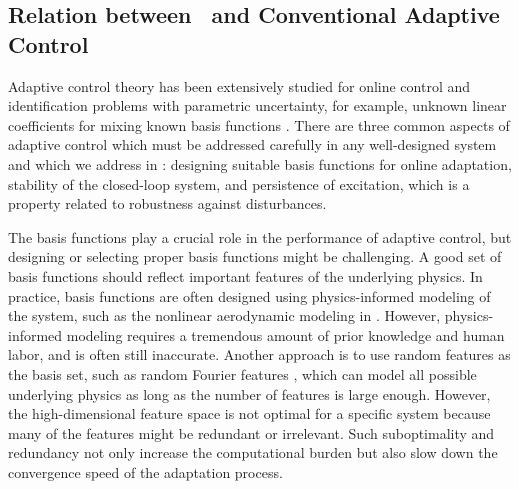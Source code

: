\subsection*{Relation between \nf~and Conventional Adaptive Control}
Adaptive control theory has been extensively studied for online control and identification problems with parametric uncertainty, for example, unknown linear coefficients for mixing known basis functions \cite{slotine1991applied,ioannou1996robust,krstic1995nonlinear,narendra2012stable,farrell_adaptive_2006,wise2006adaptive}. There are three common aspects of adaptive control which must be addressed carefully in any well-designed system and which we address in \nf: designing suitable basis functions for online adaptation, stability of the closed-loop system, and persistence of excitation, which is a property related to robustness against disturbances. 

The basis functions play a crucial role in the performance of adaptive control, but designing or selecting proper basis functions might be challenging. A good set of basis functions should reflect important features of the underlying physics. In practice, basis functions are often designed using physics-informed modeling of the system, such as the nonlinear aerodynamic modeling in \cite{shi_adaptive_2020}. However, physics-informed modeling requires a tremendous amount of prior knowledge and human labor, and is often still inaccurate. Another approach is to use random features as the basis set, such as random Fourier features , which can model all possible underlying physics as long as the number of features is large enough. However, the high-dimensional feature space is not optimal for a specific system because many of the features might be redundant or irrelevant. Such suboptimality and redundancy not only increase the computational burden but also slow down the convergence speed of the adaptation process.

